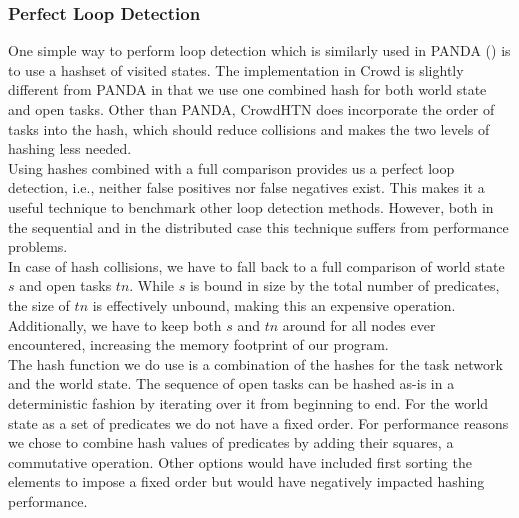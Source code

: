\subsubsection{Perfect Loop Detection}
\label{ld - perfect loop detection}
One simple way to perform loop detection which is similarly used in PANDA (\cite{holler2021loop}) is to use a hashset of visited states. The implementation in Crowd is slightly different from PANDA in that we use one combined hash for both world state and open tasks. Other than PANDA, CrowdHTN does incorporate the order of tasks into the hash, which should reduce collisions and makes the two levels of hashing less needed. \\
Using hashes combined with a full comparison provides us a perfect loop detection, i.e., neither false positives nor false negatives exist. This makes it a useful technique to benchmark other loop detection methods. However, both in the sequential and in the distributed case this technique suffers from performance problems. \\
In case of hash collisions, we have to fall back to a full comparison of world state $s$ and open tasks $tn$. While $s$ is bound in size by the total number of predicates, the size of $tn$ is effectively unbound, making this an expensive operation. Additionally, we have to keep both $s$ and $tn$ around for all nodes ever encountered, increasing the memory footprint of our program. \\
The hash function we do use is a combination of the hashes for the task network and the world state. The sequence of open tasks can be hashed as-is in a deterministic fashion by iterating over it from beginning to end. For the world state as a set of predicates we do not have a fixed order. For performance reasons we chose to combine hash values of predicates by adding their squares, a commutative operation. Other options would have included first sorting the elements to impose a fixed order but would have negatively impacted hashing performance.
\begin{comment}
	- Additionally, there is the full comparison for the world state
	- in practise this can be a problem, at the same time asymptotically it should not matter as it will be dwarfed by the 
	\todo{get some data on how many nodes share a world state on average as well as sizes of world states -> number of hash operations per world state!}
	- and the full comparison of open tasks
	- we cannot just free the open tasks and world state that are no longer needed! Both time and memory footprint are worse
	- worse memory and time complexity
	- however, it is a useful benchmark as to how many loops we *should* expect
\end{comment}


